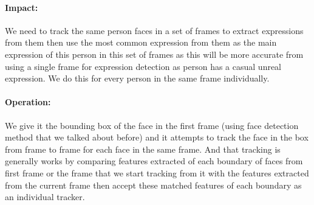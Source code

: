 \paragraph{Impact:} We need to track the same person faces in a set of frames to extract expressions from them then use the most common expression from them as the main expression of this person in this set of frames as this will be more accurate from using a single frame for expression detection as person has a casual unreal expression. We do this for every person in the same frame individually.
\paragraph{Operation:} We give it the bounding box of the face in the first frame (using face detection method that we talked about before) and it attempts to track the face in the box from frame to frame for each face in the same frame.\newline
And that tracking is generally works by comparing features extracted of each boundary of faces from first frame or the frame that we start tracking from it with the features extracted from the current frame then accept these matched features of each boundary as an individual tracker.

